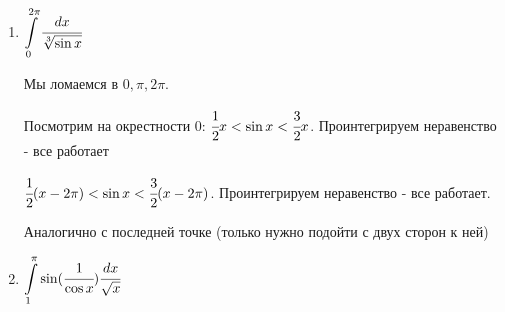 \begin{enumerate}
      \item $\displaystyle\int\limits_{0}^{2\pi} \cfrac{dx}{\sqrt[3]{\sin x}}$

      Мы ломаемся в $0, \pi, 2\pi$.

      Посмотрим на окрестности 0:
      $\cfrac{1}{2}x < \sin x < \cfrac{3}{2}x$. Проинтегрируем неравенство - все работает

      $\cfrac{1}{2}(x-2\pi)<\sin x< \cfrac{3}{2}(x-2\pi)$. Проинтегрируем неравенство - все работает.

      Аналогично с последней точке (только нужно подойти с двух сторон к ней)

      \item $\displaystyle\int\limits_{1}^{\pi}\sin(\cfrac{1}{\cos x}) \cfrac{dx}{\sqrt{x}}$
\end{enumerate}